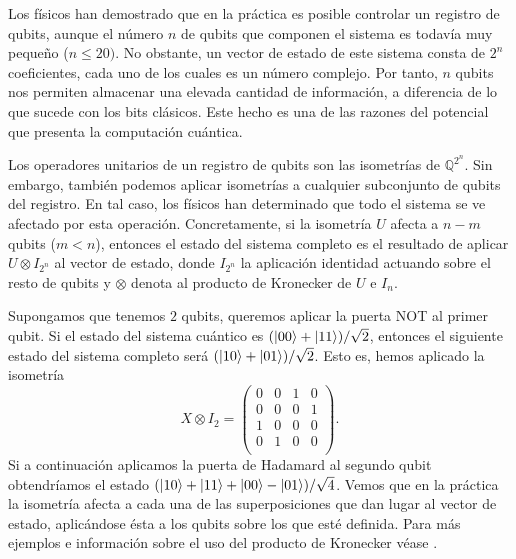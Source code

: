 \documentclass{article}
\begin{document}
Los físicos han demostrado que en la práctica es posible controlar un registro de qubits, aunque el número $n$ de qubits que componen el sistema es todavía muy pequeño ($n \le 20)$. No obstante, un vector de estado de este sistema consta de $2^n$ coeficientes, cada uno de los cuales es un número complejo. Por tanto, $n$ qubits nos permiten almacenar una elevada cantidad de información, a diferencia de lo que sucede con los bits clásicos. Este hecho es una de las razones del potencial que presenta la computación cuántica. 

Los operadores unitarios de un registro de qubits son las isometrías de $\mathbb{Q}^{2^n}$. Sin embargo, también podemos aplicar isometrías a cualquier subconjunto de qubits del registro. En tal caso, los físicos han determinado que todo el sistema se ve afectado por esta operación. Concretamente, si la isometría $U$ afecta a $n-m$ qubits ($m < n$), entonces el estado del sistema completo es el resultado de aplicar $U \otimes I_{2^n}$ al vector de estado, donde $I_{2^n}$ la aplicación identidad actuando sobre el resto de qubits y $\otimes$ denota al producto de Kronecker de $U$ e $I_n$. 

\begin{ex}
Supongamos que tenemos $2$ qubits, queremos aplicar la puerta NOT al primer qubit. Si el estado del sistema cuántico es $(\ket{00} + \ket{11}) / \sqrt{2}$, entonces el siguiente estado del sistema completo será $(\ket{10} + \ket{01}) / \sqrt{2}$. Esto es, hemos aplicado la isometría
\[ X \otimes I_2 = \begin{pmatrix}
0 & 0 & 1 & 0 \\
0 & 0 & 0 & 1 \\
1 & 0 & 0 & 0 \\
0 & 1 & 0 & 0 \\
\end{pmatrix}.\]
Si a continuación aplicamos la puerta de Hadamard al segundo qubit obtendríamos el estado $(\ket{10} + \ket{11} + \ket{00} - \ket{01}) / \sqrt{4}$. Vemos que en la práctica la isometría afecta a cada una de las superposiciones que dan lugar al vector de estado, aplicándose ésta a los qubits sobre los que esté definida. Para más ejemplos e información sobre el uso del producto de Kronecker véase \cite[Capítulo 2]{nielsen}.
\end{ex}
\end{document}
